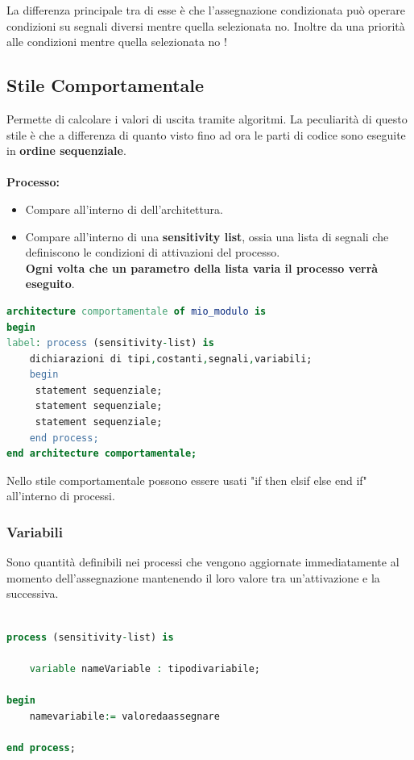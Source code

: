 \documentclass[a4paper]{book}
\begin{document}
La differenza principale tra di esse è che l'assegnazione condizionata può operare condizioni su segnali diversi mentre quella selezionata no. Inoltre da una priorità alle condizioni mentre quella selezionata no !

\subsection{Stile Comportamentale}

Permette di calcolare i valori di uscita tramite algoritmi.
La peculiarità di questo stile è che a differenza di quanto visto fino ad ora le parti di codice sono eseguite in \textbf{ordine sequenziale}.\\\\
\textbf{Processo:}
\begin{itemize}
\item Compare all'interno di dell'architettura.
\item Compare all'interno di una \textbf{sensitivity list}, ossia una lista di segnali che definiscono le condizioni di attivazioni del processo.\\\textbf{Ogni volta che un parametro della lista varia il processo verrà eseguito}.


\end{itemize}

\begin{lstlisting}[language=VHDL]
architecture comportamentale of mio_modulo is
begin
label: process (sensitivity-list) is
	dichiarazioni di tipi,costanti,segnali,variabili;
	begin
	 statement sequenziale;
	 statement sequenziale;
	 statement sequenziale;
	end process;
end architecture comportamentale;
\end{lstlisting}

Nello stile comportamentale possono essere usati "if then elsif else end if" all'interno di processi.


\subsubsection{Variabili}

Sono quantità definibili nei processi che vengono aggiornate immediatamente al momento dell'assegnazione mantenendo il loro valore tra un'attivazione e la successiva.

\begin{lstlisting}[language=VHDL]

process (sensitivity-list) is

	variable nameVariable : tipodivariabile;
	
begin
	namevariabile:= valoredaassegnare

end process;


\end{lstlisting}
\end{document}
